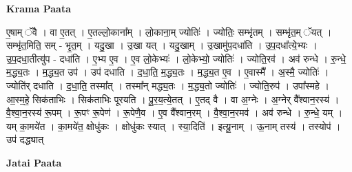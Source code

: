 \documentclass[17pt]{extarticle}
\begin{document}
\textbf{Krama Paata} \newline

ए॒षाम् ॅवै । वा ए॒तत् । ए॒तल्लो॒काना᳚म् । लो॒काना॒म् ज्योतिः॑ । ज्योतिः॒ सम्भृ॑तम् । सम्भृ॑त॒म् ॅयत् । सम्भृ॑त॒मिति॒ सम् - भृ॒त॒म् । यदु॒खा । उ॒खा यत् । यदु॒खाम् । उ॒खामु॑प॒दधा॑ति । उ॒प॒दधा᳚त्ये॒भ्यः । उ॒प॒दधा॒तीत्यु॑प - दधा॑ति । ए॒भ्य ए॒व । ए॒व लो॒केभ्यः॑ । लो॒केभ्यो॒ ज्योतिः॑ । ज्योति॒रव॑ । अव॑ रुन्धे । रु॒न्धे॒ म॒द्ध्य॒तः । म॒द्ध्य॒त उप॑ । उप॑ दधाति । द॒धा॒ति॒ म॒द्ध्य॒तः । म॒द्ध्य॒त ए॒व । ए॒वास्मै᳚ । अ॒स्मै॒ ज्योतिः॑ । ज्योति॑र् दधाति । द॒धा॒ति॒ तस्मा᳚त् । तस्मा᳚न् मद्ध्य॒तः । म॒द्ध्य॒तो ज्योतिः॑ । ज्योति॒रुप॑ । उपा᳚स्महे । आ॒स्म॒हे॒ सिक॑ताभिः । सिक॑ताभिः पूरयति । पू॒र॒य॒त्ये॒तत् । ए॒तद् वै । वा अ॒ग्नेः । अ॒ग्नेर् वै᳚श्वान॒रस्य॑ । वै॒श्वा॒न॒रस्य॑ रू॒पम् । रू॒पꣳ रू॒पेण॑ । रू॒पेणै॒व । ए॒व वै᳚श्वान॒रम् । वै॒श्वा॒न॒रमव॑ । अव॑ रुन्धे । रु॒न्धे॒ यम् । यम् का॒मये॑त । का॒मये॑त॒ क्षोधु॑कः । क्षोधु॑कः स्यात् । स्या॒दिति॑ । इत्यू॒नाम् । ऊ॒नाम् तस्य॑ । तस्योप॑ । उप॑ दद्ध्यात् \newline

\textbf{Jatai Paata} \newline
\end{document}
